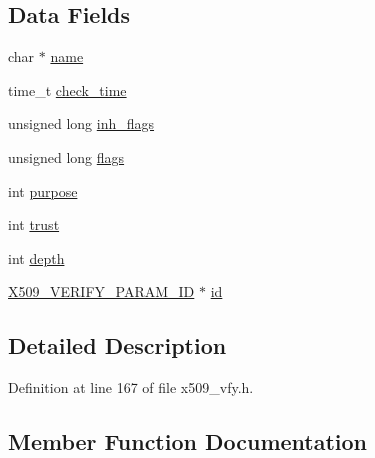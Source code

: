 \subsection*{Data Fields}
\begin{DoxyCompactItemize}
\item 
char $\ast$ \hyperlink{struct_x509___v_e_r_i_f_y___p_a_r_a_m__st_ad547fb8186b526cb1b588daad4334fbe}{name}
\item 
time\+\_\+t \hyperlink{struct_x509___v_e_r_i_f_y___p_a_r_a_m__st_ab3972cc6a21b2b5afb2bac4243b3a0a8}{check\+\_\+time}
\item 
unsigned long \hyperlink{struct_x509___v_e_r_i_f_y___p_a_r_a_m__st_ada551eff87a3d470a799ddd7e0757a2f}{inh\+\_\+flags}
\item 
unsigned long \hyperlink{struct_x509___v_e_r_i_f_y___p_a_r_a_m__st_a9e339c2784bd040b26a5112866700bff}{flags}
\item 
int \hyperlink{struct_x509___v_e_r_i_f_y___p_a_r_a_m__st_aea60aa19f747b78afd1139e406a352f2}{purpose}
\item 
int \hyperlink{struct_x509___v_e_r_i_f_y___p_a_r_a_m__st_afd5c82d38ea055842dd3ab04fd2e316e}{trust}
\item 
int \hyperlink{struct_x509___v_e_r_i_f_y___p_a_r_a_m__st_acb5ba97551079e0b072c62c21d784ac5}{depth}
\item 
\hyperlink{crypto_2x509_2x509__vfy_8h_a15e6d9b5f0b17396c823b3e5872fe3c5}{X509\+\_\+\+V\+E\+R\+I\+F\+Y\+\_\+\+P\+A\+R\+A\+M\+\_\+\+ID} $\ast$ \hyperlink{struct_x509___v_e_r_i_f_y___p_a_r_a_m__st_a1e2d974ae8782384226dcb0af0fa87c8}{id}
\end{DoxyCompactItemize}


\subsection{Detailed Description}


Definition at line 167 of file x509\+\_\+vfy.\+h.



\subsection{Member Function Documentation}
